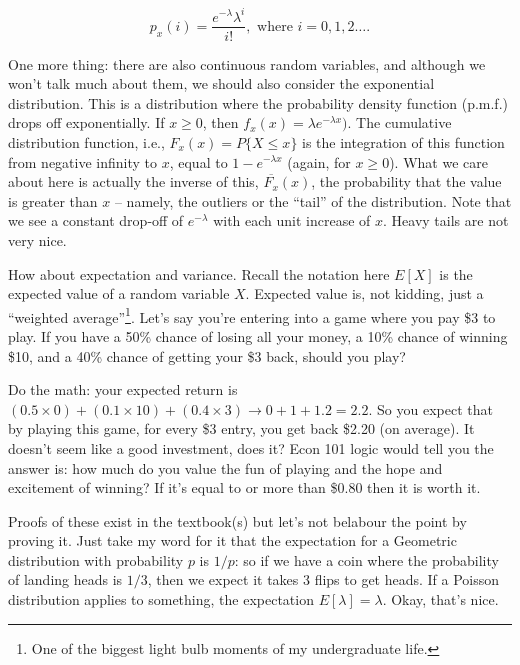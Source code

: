 \[
	p_{x}(i) = \dfrac{e^{-\lambda}\lambda^{i}}{i!},\mbox{ where $i = 0, 1, 2\ldots$}.
\]

One more thing: there are also continuous random variables, and although we won't talk much about them, we should also consider the exponential distribution. This is a distribution where the probability density function (p.m.f.) drops off exponentially. If $x \geq 0$, then $f_{x}(x) = \lambda e^{-\lambda x})$. The cumulative distribution function, i.e., $F_{x}(x) = P\{ X \leq x \}$ is the integration of this function from negative infinity to $x$, equal to $1-e^{-\lambda x}$ (again, for $x \geq 0$). What we care about here is actually the inverse of this, $\overline{F_{x}}(x)$, the probability that the value is greater than $x$ -- namely, the outliers or the ``tail'' of the distribution. Note that we see a constant drop-off of $e^{-\lambda}$ with each unit increase of $x$. Heavy tails are not very nice. 


How about expectation and variance. Recall the notation here $E[X]$ is the expected value of a random variable $X$. Expected value is, not kidding, just a ``weighted average''\footnote{One of the biggest light bulb moments of my undergraduate life.}. Let's say you're entering into a game where you pay \$3 to play. If you have a 50\% chance of losing all your money, a 10\% chance of winning \$10, and a 40\% chance of getting your \$3 back, should you play?

Do the math: your expected return is $(0.5 \times 0) + (0.1 \times 10) + (0.4 \times 3) \rightarrow 0 + 1 + 1.2 = 2.2$. So you expect that by playing this game, for every \$3 entry, you get back \$2.20 (on average). It doesn't seem like a good investment, does it? Econ 101 logic would tell you the answer is: how much do you value the fun of playing and the hope and excitement of winning? If it's equal to or more than \$0.80 then it is worth it.

Proofs of these exist in the textbook(s) but let's not belabour the point by proving it. Just take my word for it that the expectation for a Geometric distribution with probability $p$ is $1/p$: so if we have a coin where the probability of landing heads is $1/3$, then we expect it takes 3 flips to get heads. If a Poisson distribution applies to something, the expectation $E[\lambda] = \lambda$. Okay, that's nice.

